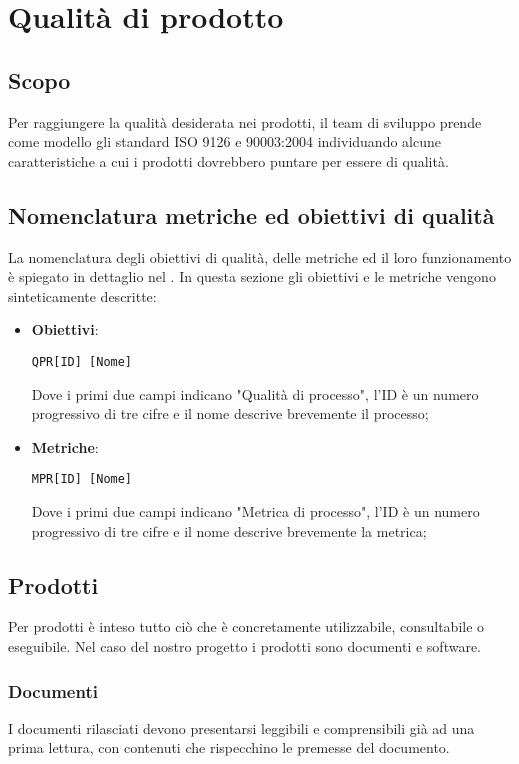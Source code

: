 \section{Qualità di prodotto}

\subsection{Scopo}
Per raggiungere la qualità desiderata nei prodotti, il team di sviluppo prende come modello gli standard ISO 9126 e 90003:2004 individuando alcune caratteristiche a cui i prodotti dovrebbero puntare per essere di qualità.

\subsection{Nomenclatura metriche ed obiettivi di qualità}
La nomenclatura degli obiettivi di qualità, delle metriche ed il loro funzionamento è spiegato in dettaglio nel \Doc{\NdPv}. In questa sezione gli obiettivi e le metriche vengono sinteticamente descritte:

\begin{itemize}
	\item \textbf{Obiettivi}: 
	
	\begin{center}
		\texttt{QPR[ID] [Nome]}
	\end{center} 
	
	Dove i primi due campi indicano "Qualità di processo", l'ID è un numero progressivo di tre cifre e il nome descrive brevemente il processo;
	\item \textbf{Metriche}:
	
	\begin{center}
		\texttt{MPR[ID] [Nome]}
	\end{center}
	
	Dove i primi due campi indicano "Metrica di processo", l'ID è un numero progressivo di tre cifre e il nome descrive brevemente la metrica;
\end{itemize}


\subsection{Prodotti} %
Per prodotti è inteso tutto ciò che è concretamente utilizzabile, consultabile o eseguibile. Nel caso del nostro progetto i prodotti sono documenti e software.
	\subsubsection{Documenti}
	I documenti rilasciati devono presentarsi leggibili e comprensibili già ad una prima lettura, con contenuti che rispecchino le premesse del documento.


